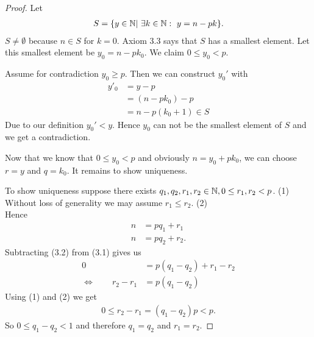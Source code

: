 \begin{proof} Let
\begin{align*}
S = \{ y \in \mathbb N | ~ \exists k \in \mathbb N: ~ y = n-pk \} .
\end{align*}
$S \neq \emptyset$ because $n \in S$ for $k=0$.
Axiom 3.3 says that $S$ has a smallest element. Let this smallest element be $y_0 = n-p k_0$. We claim $0 \leq y_0 <p$. 

Assume for contradiction $y_0 \geq p$. Then we can construct $y_0'$ with
\begin{align*}
y'_0 & = y-p \\
& = (n-pk_0) -p \\
& = n-p(k_0+1) \in S
\end{align*}
Due to our definition $y_0'<y$. Hence $y_0$ can not be the smallest element of $S$ and we get a contradiction.

Now that we know that $0 \le y_0 < p$ and obviously $n=y_0+pk_0$, we can choose $r=y$ and $q = k_0$. 
It remains to show uniqueness.

To show uniqueness suppose there exists $q_1, q_2, r_1,r_2 \in \mathbb N, 0 \le r_1,r_2 <p$. \hfill (1) \\ 
Without loss of generality we may assume $r_1 \leq r_2$. \hfill (2) \\
Hence
\begin{align*}
n & = pq_1 +r_1 \tag {3.1} \\
n & = pq_2 +r_2. \tag {3.2}
\end{align*}
 Subtracting (3.2) from (3.1) gives us
\begin{align*}
0 & = p(q_1-q_2) + r_1 -r_2 \\
\Leftrightarrow \qquad r_2-r_1 & = p(q_1-q_2)
\end{align*}
Using (1) and (2) we get
\begin{align*}
0 \leq r_2-r_1 = (q_1-q_2) p <p.
\end{align*}
So $0\leq q_1-q_2 <1$ and therefore $q_1=q_2$ and $r_1=r_2$.
\end{proof}



